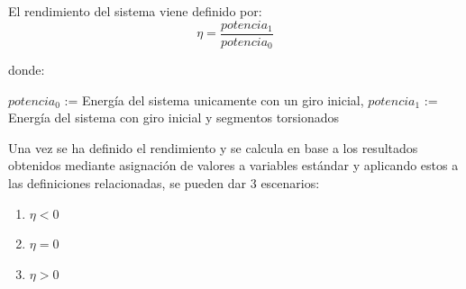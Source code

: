    \begin{definicion}
El rendimiento del sistema viene definido por:
 $$ \eta = \dfrac{potencia_1}{potencia_0} $$ 
 
 donde:
 
  \centering $potencia_0$ := Energía del sistema unicamente con un giro inicial, \hspace{4} $potencia_1$ := Energía del sistema con giro inicial y segmentos torsionados
 \label{def:rendimiento_potencias}
 \end{definicion}
 
 Una vez se ha definido el rendimiento y se calcula en base a los resultados obtenidos mediante asignación de valores a variables estándar y aplicando estos a las definiciones relacionadas, se pueden dar 3 escenarios:
 
  \begin{enumerate}
    \item $\eta < 0$ \label{enum:menor_cero}
    \item $\eta = 0$ \label{enum:igual_cero}
    \item $\eta > 0$ \label{enum:mayor_cero}
\end{enumerate}
 
